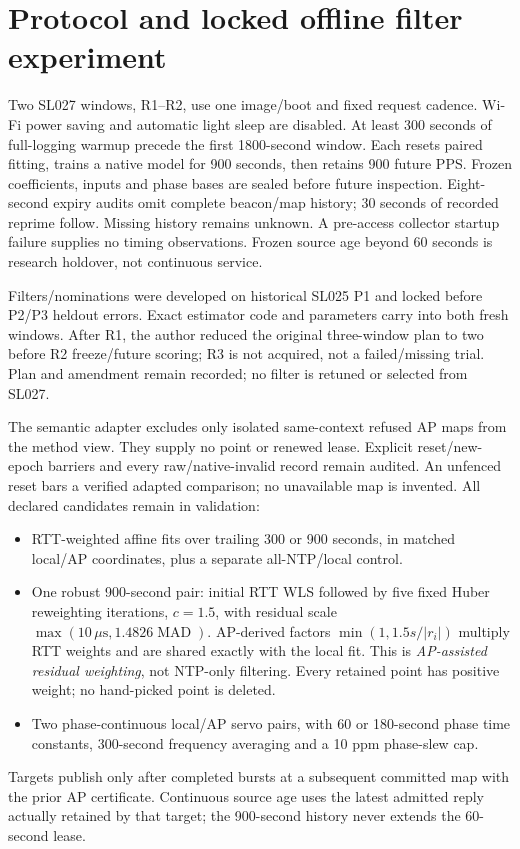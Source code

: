 \documentclass[10pt,letterpaper]{article}
\newcommand{\us}{\ensuremath{\,\mu\mathrm{s}}}
\begin{document}
\section{Protocol and locked offline filter experiment}
Two SL027 windows, R1--R2, use one image/boot and fixed request cadence.
Wi-Fi power saving and automatic light sleep are disabled.
At least 300 seconds of full-logging warmup precede the first 1800-second window.
Each resets paired fitting, trains a native model for 900 seconds, then retains
900 future PPS. Frozen coefficients, inputs and phase bases are sealed before
future inspection. Eight-second expiry audits omit complete beacon/map history;
30 seconds of recorded reprime follow. Missing history remains unknown. A
pre-access collector startup failure supplies no timing observations. Frozen
source age beyond 60 seconds is research holdover, not continuous service.

Filters/nominations were developed on historical SL025 P1 and locked before
P2/P3 heldout errors. Exact estimator code and parameters carry into both fresh
windows. After R1, the author reduced the original three-window plan to two
before R2 freeze/future scoring; R3 is not acquired, not a failed/missing trial. Plan
and amendment remain recorded; no filter is retuned or selected from SL027.

The semantic adapter excludes only isolated same-context refused AP maps from
the method view. They supply no point or renewed lease. Explicit reset/new-epoch
barriers and every raw/native-invalid record remain audited. An unfenced reset
bars a verified adapted comparison; no unavailable map is invented.
All declared candidates remain in validation:
\begin{itemize}\setlength{\itemsep}{0pt}
\item RTT-weighted affine fits over trailing 300 or 900 seconds, in matched
local/AP coordinates, plus a separate all-NTP/local control.
\item One robust 900-second pair: initial RTT WLS followed by five fixed Huber
reweighting iterations, $c=1.5$, with residual scale
$\max(10\us,1.4826\operatorname{MAD})$. AP-derived factors
$\min(1,1.5s/|r_i|)$ multiply RTT weights and are shared exactly with the local
fit. This is \emph{AP-assisted residual weighting}, not NTP-only filtering. Every
retained point has positive weight; no hand-picked point is deleted.
\item Two phase-continuous local/AP servo pairs, with 60 or 180-second phase
time constants, 300-second frequency averaging and a 10 ppm phase-slew cap.
\end{itemize}
Targets publish only after completed bursts at a subsequent committed map
with the prior AP certificate. Continuous source age uses the latest admitted
reply actually retained by that target; the 900-second history never extends
the 60-second lease.
\end{document}
